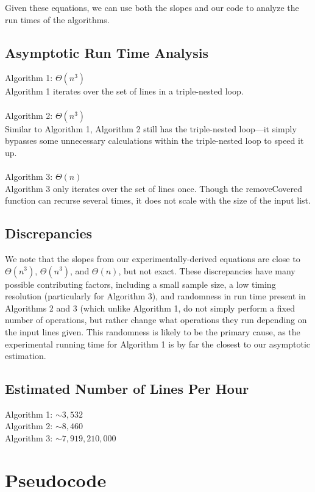\documentclass{article}
\begin{document}
Given these equations, we can use both the slopes and our code to analyze the run times of the algorithms.

\subsection*{Asymptotic Run Time Analysis}
Algorithm 1: $\Theta(n^3)$\\
\indent Algorithm 1 iterates over the set of lines in a triple-nested loop.\\\\
Algorithm 2: $\Theta(n^3)$\\
\indent Similar to Algorithm 1, Algorithm 2 still has the triple-nested loop---it simply bypasses some unnecessary calculations within the triple-nested loop to speed it up.\\\\
Algorithm 3: $\Theta(n)$\\
\indent Algorithm 3 only iterates over the set of lines once.  Though the removeCovered function can recurse several times, it does not scale with the size of the input list.

\subsection*{Discrepancies}
We note that the slopes from our experimentally-derived equations are close to $\Theta(n^3)$, $\Theta(n^3)$, and $\Theta(n)$, but not exact.  These discrepancies have many possible contributing factors, including a small sample size, a low timing resolution (particularly for Algorithm 3), and randomness in run time present in Algorithms 2 and 3 (which unlike Algorithm 1, do not simply perform a fixed number of operations, but rather change what operations they run depending on the input lines given.  This randomness is likely to be the primary cause, as the experimental running time for Algorithm 1 is by far the closest to our asymptotic estimation.

\subsection*{Estimated Number of Lines Per Hour}
Algorithm 1: $\sim 3,532$\\
Algorithm 2: $\sim 8,460$\\
Algorithm 3: $\sim 7,919,210,000$

\pagebreak

\section*{Pseudocode}

\end{document}
